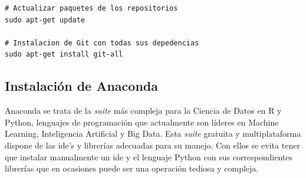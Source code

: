 \vspace{0.5cm}
\begin{lstlisting}[language=iPython,caption=Instalación de Git,captionpos=b,label={lst:install-git}]
# Actualizar paquetes de los repositorios
sudo apt-get update

# Instalacion de Git con todas sus depedencias
sudo apt-get install git-all
\end{lstlisting}

\subsection{Instalación de Anaconda}
\label{subsec:instalacion-anaconda}

Anaconda se trata de la \textit{suite} más compleja para la Ciencia de Datos en R y Python, lenguajes de programación que actualmente son líderes en Machine Learning, Inteligencia Artificial y Big Data. Esta \textit{suite} gratuita y multiplataforma dispone de las \gls{ide}'s y librerías adecuadas para su manejo. Con ellos se evita tener que instalar manualmente un \gls{ide} y el lenguaje Python con sus correspondientes librerías que en ocasiones puede ser una operación tediosa y compleja.

